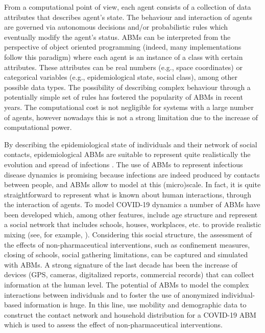 \documentclass[11pt,a4paper]{article}
\begin{document}
From a computational point of view, each agent consists of a collection of data attributes that describes agent's state. The behaviour and interaction of agents are governed via autonomous decisions and/or probabilistic rules which eventually modify the agent's status. ABMs can be interpreted from the perspective of object oriented programming (indeed, many implementations follow this paradigm) where each agent is an instance of a class with certain attributes. These attributes can be real numbers (e.g., space coordinates) or categorical variables (e.g., epidemiological state, social class), among other possible data types.  The possibility of describing complex behaviour through a potentially simple set of rules has fostered the popularity of ABMs in recent years. The computational cost is not negligible for systems with a large number of agents, however nowadays this is not a strong limitation due to the increase of computational power.

By describing the epidemiological state of individuals and their network of social contacts, epidemiological ABMs are suitable to represent quite realistically the evolution and spread of infections \citep{Roche2011}. The use of ABMs to represent infectious disease dynamics is promising because infections are indeed produced by contacts between people, and ABMs allow to model at this (micro)scale. In fact, it is quite straightforward to represent what is known about human interactions, through the interaction of agents. To model COVID-19 dynamics a number of ABMs have been developed which, among other features, include age structure and represent a social network that includes schools, houses, workplaces, etc. to provide realistic mixing (see, for example, \cite{Kerr2020,Flaxman2020,Simoy2021}).  Considering this social structure, the assessment of the effects of non-pharmaceutical interventions, such as confinement measures, closing of schools, social gathering limitations, can be captured and simulated with ABMs. A strong signature of the last decade has been the increase of devices (GPS, cameras, digitalized reports, commercial records) that can collect information at the human level. The potential of ABMs to model the complex interactions between individuals and to foster the use of anonymized individual-based information is huge. In this line, \cite{Aleta2020} use mobility and demographic data to construct the contact network and household distribution for a COVID-19 ABM which is used to assess the effect of non-pharmaceutical interventions.
\end{document}
